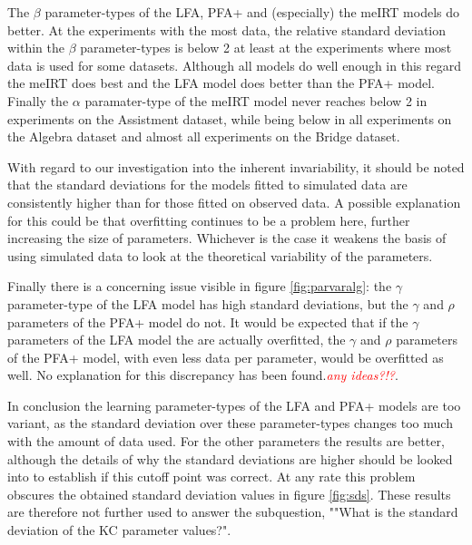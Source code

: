 \documentclass{scrartcl}
\newcommand\todo[1]{\textit{\textcolor{red}{#1}}}
\begin{document}
The $\beta$ parameter-types of the LFA, PFA+ and (especially) the meIRT models do better. At the experiments with the most data, the relative standard deviation within the $\beta$ parameter-types is below 2 at least at the experiments where most data is used for some datasets. Although all models do well enough in this regard the meIRT does best and the LFA model does better than the PFA+ model. Finally the $\alpha$ paramater-type of the meIRT model never reaches below 2 in experiments on the Assistment dataset, while being below in all experiments on the Algebra dataset and almost all experiments on the Bridge dataset.  

With regard to our investigation into the inherent invariability, it should be noted that the standard deviations for the models fitted to simulated data are consistently higher than for those fitted on observed data. A possible explanation for this could be that overfitting continues to be a problem here, further increasing the size of parameters. Whichever is the case it weakens the basis of using simulated data to look at the theoretical variability of the parameters.

Finally there is a concerning issue visible in figure \ref{fig:parvaralg}: the $\gamma$ parameter-type of the LFA model has high standard deviations, but the $\gamma$ and $\rho$ parameters of the PFA+ model do not. It would be expected that if the $\gamma$ parameters of the LFA model the are actually overfitted, the $\gamma$ and $\rho$ parameters of the PFA+ model, with even less data per parameter, would be overfitted as well. No explanation for this discrepancy has been found.\todo{any ideas?!?}. 

In conclusion the learning parameter-types of the LFA and PFA+ models are too variant, as the standard deviation over these parameter-types changes too much with the amount of data used. For the other parameters the results are better, although the details of why the standard deviations are higher should be looked into to establish if this cutoff point was correct. At any rate this problem obscures the obtained standard deviation values in figure \ref{fig:sds}. These results are therefore not further used to answer the subquestion, ""What is the standard deviation of the KC parameter values?".
\end{document}
